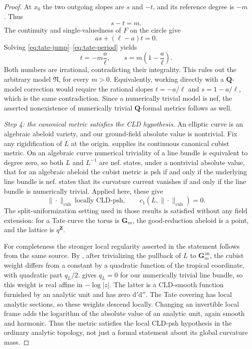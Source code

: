 \begin{proof}
At $x_0$ the two outgoing slopes are $s$ and $-t$, and its
reference degree is $-m$. Thus
\begin{equation}
\label{eq:tate-jump}
 s-t=m.
\end{equation}
The continuity and single-valuedness of $F$ on the circle give
\begin{equation}
\label{eq:tate-period}
 as+(\ell-a)t=0.
\end{equation}
Solving \eqref{eq:tate-jump}--\eqref{eq:tate-period} yields
\[
 t=-m\frac{a}{\ell},\qquad
 s=m\left(1-\frac{a}{\ell}\right).
\]
Both numbers are irrational, contradicting their integrality. This
rules out the arbitrary model $\mathfrak N$, for every $m>0$.
Equivalently, working directly with a $\mathbf Q$-model correction
would require the rational slopes
$t=-a/\ell$ and $s=1-a/\ell$, which is the same contradiction.
Since a numerically trivial model is nef, the asserted nonexistence of
numerically trivial $\mathbf Q$-formal metrics follows as well.

\emph{Step 4: the canonical metric satisfies the CLD hypothesis.}
An elliptic curve is an algebraic abeloid variety, and our ground-field
absolute value is nontrivial. Fix any rigidification of $L$ at the
origin. \cite[Lemma 19.1.6]{CLD25} supplies its continuous canonical cubist
metric. On an algebraic curve numerical triviality of a line bundle is
equivalent to degree zero, so both $L$ and $L^{-1}$ are nef.
\cite[Proposition 19.3.1]{CLD25} states, under a nontrivial absolute value,
that for an algebraic abeloid the cubist metric is psh if and only if
the underlying line bundle is nef. \cite[Corollary 19.3.2]{CLD25} states
that its curvature current vanishes if and only if the line bundle is
numerically trivial. Applied here, these give
\[
 \|\cdot\|_{\mathrm{cub}}\ \text{locally CLD-psh},
 \qquad c_1(L,\|\cdot\|_{\mathrm{cub}})=0.
\]
The split-uniformization setting used in those results is satisfied
without any field extension: for a Tate curve the torus is
$\mathbf G_m$, the good-reduction abeloid is a point, and the lattice
is $q^{\mathbf Z}$.

For completeness the stronger local regularity asserted in the
statement follows from the same source. By \cite[Proposition 19.2.5]{CLD25},
after trivializing the pullback of $L$ to $\mathbf G_m^{\mathrm{an}}$,
the cubist weight differs from a constant by a quadratic function of
the tropical coordinate, with quadratic part $q_L/2$.
\cite[Corollary 19.3.2]{CLD25} gives $q_L=0$ for our numerically trivial
line bundle, so this weight is real affine in $-\log|z|$.
The latter is a CLD-smooth function furnished by an analytic unit and
has zero $\mathrm d'\mathrm d''$. The Tate covering has local analytic sections, so
these weights descend locally. Changing an invertible local frame
adds the logarithm of the absolute value of an analytic unit, again
smooth and harmonic. Thus the metric satisfies the local CLD-psh
hypothesis in the ordinary analytic topology, not just a formal
statement about its global curvature mass.


\end{proof}
